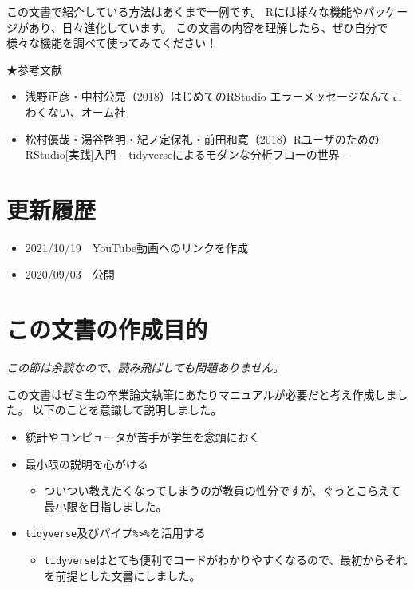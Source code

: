 \documentclass[
]{book}
\providecommand{\tightlist}{%
  \setlength{\itemsep}{0pt}\setlength{\parskip}{0pt}}
\begin{document}
この文書で紹介している方法はあくまで一例です。
Rには様々な機能やパッケージがあり、日々進化しています。
この文書の内容を理解したら、ぜひ自分で様々な機能を調べて使ってみてください！

★参考文献

\begin{itemize}
\tightlist
\item
  浅野正彦・中村公亮（2018）はじめてのRStudio エラーメッセージなんてこわくない、オーム社
\item
  松村優哉・湯谷啓明・紀ノ定保礼・前田和寛（2018）RユーザのためのRStudio{[}実践{]}入門 −tidyverseによるモダンな分析フローの世界−
\end{itemize}

\hypertarget{ux66f4ux65b0ux5c65ux6b74}{%
\section{更新履歴}\label{ux66f4ux65b0ux5c65ux6b74}}

\begin{itemize}
\tightlist
\item
  2021/10/19　YouTube動画へのリンクを作成
\item
  2020/09/03　公開
\end{itemize}

\hypertarget{ux3053ux306eux6587ux66f8ux306eux4f5cux6210ux76eeux7684}{%
\section{この文書の作成目的}\label{ux3053ux306eux6587ux66f8ux306eux4f5cux6210ux76eeux7684}}

\emph{この節は余談なので、読み飛ばしても問題ありません。}

この文書はゼミ生の卒業論文執筆にあたりマニュアルが必要だと考え作成しました。
以下のことを意識して説明しました。

\begin{itemize}
\tightlist
\item
  統計やコンピュータが苦手が学生を念頭におく
\item
  最小限の説明を心がける

  \begin{itemize}
  \tightlist
  \item
    ついつい教えたくなってしまうのが教員の性分ですが、ぐっとこらえて最小限を目指しました。
  \end{itemize}
\item
  \texttt{tidyverse}及びパイプ\texttt{\%\textgreater{}\%}を活用する

  \begin{itemize}
  \tightlist
  \item
    \texttt{tidyverse}はとても便利でコードがわかりやすくなるので、最初からそれを前提とした文書にしました。
  \end{itemize}
\end{itemize}
\end{document}
